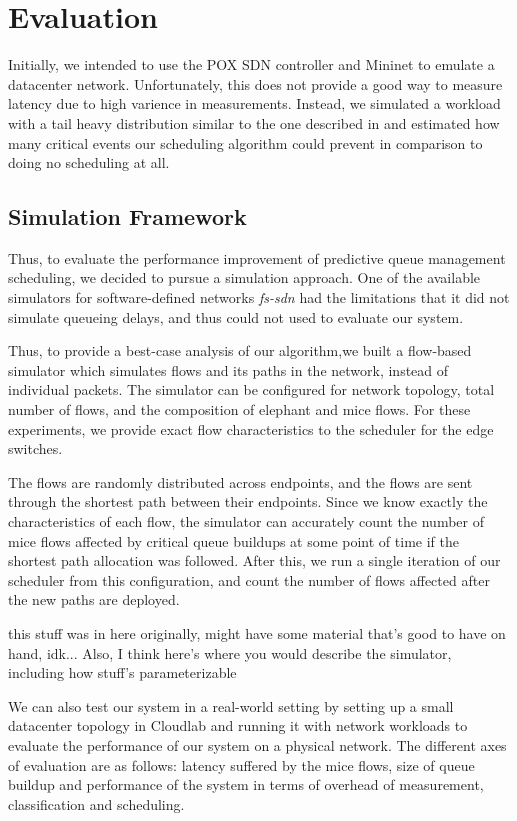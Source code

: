 \section{Evaluation}
Initially, we intended to use the POX SDN controller and Mininet to emulate a
datacenter network. Unfortunately, this does not provide a good way to measure
latency due to high varience in measurements. Instead, we simulated a workload
with a tail heavy distribution similar to the one described in
\cite{dctcp} and estimated how many critical events our scheduling algorithm
could prevent in comparison to doing no scheduling at all.

\subsection{Simulation Framework}
Thus, to evaluate the performance improvement of predictive
queue management scheduling, we decided to pursue a simulation
approach. One of the available simulators for software-defined networks
\emph{fs-sdn} \cite{fssdn} had the limitations that it did not simulate
queueing delays, and thus could not used to evaluate our system. 

Thus, to provide a best-case analysis of our algorithm,we built a 
flow-based simulator which simulates flows and its paths in the network,
instead of individual packets. The simulator can be configured for network topology,
total number of flows, and the composition of elephant and mice flows. For these
experiments, we provide exact  flow characteristics to the scheduler for the edge
switches. 

The flows are randomly distributed across endpoints, and the flows
are sent through the shortest path between their endpoints. Since we know
exactly the characteristics of each flow, the simulator can accurately count the
number of mice flows affected by critical queue buildups at some point of time
if the shortest path allocation was followed. After this, we run a single iteration
of our scheduler from this configuration, and count the number of flows 
affected after the new paths are deployed. 

\iffalse this stuff was in here originally, might have some material that's
good to have on hand, idk... Also, I think here's where you would describe the
simulator, including how stuff's parameterizable

We can also test our system in a real-world setting by setting up a small datacenter topology in Cloudlab and running it with network workloads to evaluate the performance of our system on a physical network.  The different axes of evaluation are as follows: latency suffered by the mice flows, size of queue buildup and performance of the system in terms of overhead of measurement, classification and scheduling. 


